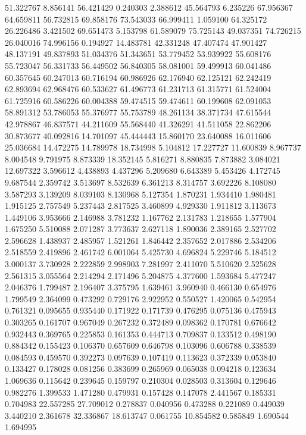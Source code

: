 51.322767
8.856141
56.421429
0.240303
2.388612
45.564793
6.235226
67.956367
64.659811
56.732815
69.858176
73.543033
66.999411
1.059100
64.325172
26.226486
3.421502
69.651473
5.153798
61.589079
75.725143
49.037351
74.726215
26.040016
74.996156
0.194927
14.483781
42.331248
47.407474
47.901427
48.137191
49.837893
51.034376
51.343651
53.779452
53.939922
55.608176
55.723047
56.331733
56.449502
56.840305
58.081001
59.499913
60.041486
60.357645
60.247013
60.716194
60.986926
62.176940
62.125121
62.242419
62.893694
62.968476
60.533627
61.496773
61.231713
61.315771
61.524004
61.725916
60.586226
60.004388
59.474515
59.474611
60.199608
62.091053
58.891312
53.786053
55.376977
55.753789
48.261134
38.371734
47.615544
42.978867
46.837571
44.211609
55.568440
41.326291
41.511058
22.862206
30.873677
40.092816
14.701097
45.444443
15.860170
23.640088
16.011606
25.036684
14.472275
14.789978
18.734998
5.104812
17.227727
11.600839
8.967737
8.004548
9.791975
8.873339
18.352145
5.816271
8.880835
7.873882
3.084021
12.697322
3.596612
4.438893
4.437296
5.209680
6.643389
5.453426
4.172745
9.687544
2.359742
3.513697
8.532639
6.361213
8.314757
3.692226
8.108080
3.587293
3.139209
8.039103
8.130968
5.127354
1.870231
1.934410
1.980481
1.915125
2.757549
5.237443
2.817525
3.460899
4.929330
1.911812
3.113673
1.449106
3.953666
2.146988
3.781232
1.167762
2.131783
1.218655
1.577904
1.675250
5.510088
2.071287
3.773637
2.627118
1.890036
2.389165
2.527702
2.596628
1.438937
2.485957
1.521261
1.846442
2.357652
2.017886
2.534206
2.518559
2.419896
2.461742
6.001064
5.425730
4.696824
5.229746
5.184512
3.000137
3.730928
2.222859
2.998903
7.281997
2.411070
5.510620
2.525628
2.561315
3.055564
2.214294
2.171496
5.204875
4.377600
1.593684
5.477247
2.046376
1.799487
2.196407
3.375795
1.639461
3.960940
0.466130
0.654976
1.799549
2.364099
0.473292
0.729176
2.922952
0.550527
1.420065
0.542954
0.761321
0.095655
0.935440
0.171922
0.171739
0.476295
0.075136
0.475943
0.303265
0.161707
0.967049
0.267232
0.372489
0.098362
0.170781
0.676642
0.932443
0.369765
0.225853
0.161353
0.444713
0.709837
0.133512
0.498190
0.884342
0.155423
0.106370
0.657609
0.646798
0.103096
0.606788
0.338539
0.084593
0.459570
0.392273
0.097639
0.107419
0.113623
0.372339
0.053840
0.133427
0.178028
0.081256
0.383699
0.265969
0.065038
0.094218
0.123634
1.069636
0.115642
0.239645
0.159797
0.210304
0.028503
0.313604
0.129646
0.982276
1.399533
1.471280
0.479931
0.157428
0.147078
2.441567
0.185331
0.704983
22.557285
27.709012
0.278837
0.040956
0.473288
0.221089
0.449039
3.440210
2.361678
32.336867
18.613747
0.061755
10.854582
0.585849
1.690544
1.694995
